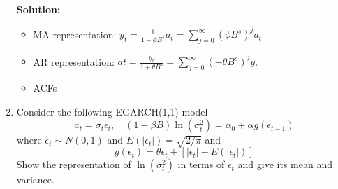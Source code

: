 \documentclass{article}
\begin{document}
\begin{enumerate}
	\textbf{Solution:}
	\begin{itemize}
		\item MA representation: $y_{t}=\frac{1}{1-\phi B^{s}} a_{t}=\sum_{j=0}^{\infty}\left(\phi B^{s}\right)^{j} a_{t}$
		\item AR representation: $a t=\frac{y_{t}}{1+\theta B^{s}}=\sum_{j=0}^{\infty}\left(-\theta B^{s}\right)^{j} y_{t}$
		\item ACFs
	\end{itemize}
	
	\item Consider the following EGARCH(1,1) model
	\begin{equation*}
	a_{t}=\sigma_{t} \epsilon_{t}, \quad(1-\beta B) \ln \left(\sigma_{t}^{2}\right)=\alpha_{0}+\alpha g\left(\epsilon_{t-1}\right)
	\end{equation*}
	where $\epsilon_{t} \sim N(0,1)$ and $E\left(\left|\epsilon_{t}\right|\right)=\sqrt{2 / \pi}$ and
	\begin{equation*}
	g\left(\epsilon_{t}\right)=\theta \epsilon_{t}+\left[\left|\epsilon_{t}\right|-E\left(\left|\epsilon_{t}\right|\right)\right]
	\end{equation*}
	Show the representation of $\ln(\sigma_t^2)$ in terms of $\epsilon_t$ and give its mean and variance.
	

\end{enumerate}
\end{document}
